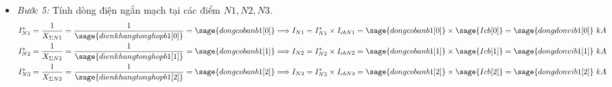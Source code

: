 \documentclass[12pt,a4paper]{article}
\newcommand{\unit}[1]{~#1}							%
\begin{document}
\begin{itemize}
\begin{itemize}
\begin{itemize}
			\end{itemize}
			\item \textit{Bước 5:} Tính dòng điện ngắn mạch tại các điểm $N1, N2, N3$.
				\begin{equation*}
					\begin{split}
						I_{N1}^\ast & = \dfrac{1}{X_{\Sigma N1}} = \dfrac{1}{\sage{dienkhangtonghopb1[0]}} = \sage{dongcobanb1[0]} \Longrightarrow I_{N1} = I_{N1}^\ast \times I_{cb N1} = \sage{dongcobanb1[0]} \times \sage{Icb[0]} = \sage{dongdonvib1[0]}\unit{kA} \\			
						I_{N2}^\ast & = \dfrac{1}{X_{\Sigma N2}} = \dfrac{1}{\sage{dienkhangtonghopb1[1]}} = \sage{dongcobanb1[1]} \Longrightarrow I_{N2} = I_{N2}^\ast \times I_{cb N2} = \sage{dongcobanb1[1]} \times \sage{Icb[1]} = \sage{dongdonvib1[1]}\unit{kA}	\\
						I_{N3}^\ast & = \dfrac{1}{X_{\Sigma N3}} = \dfrac{1}{\sage{dienkhangtonghopb1[2]}} = \sage{dongcobanb1[2]} \Longrightarrow I_{N3} = I_{N3}^\ast \times I_{cb N3} = \sage{dongcobanb1[2]} \times \sage{Icb[2]} = \sage{dongdonvib1[2]}\unit{kA}						
					\end{split}
			\end{equation*}


\end{itemize}
\end{itemize}
\end{document}
